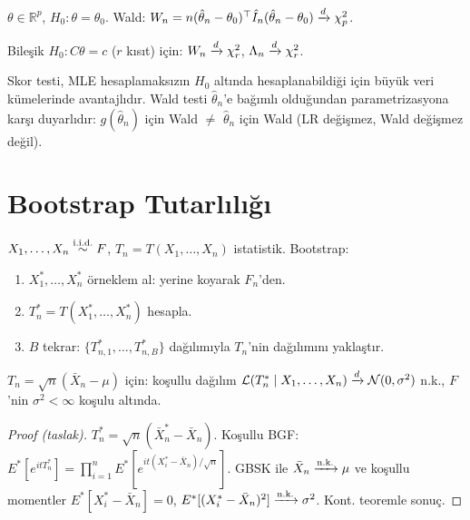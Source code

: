 \begin{ornek}\label{ex:wald_pvector}
$\theta\in\mathbb{R}^p$, $H_0:\theta=\theta_0$. Wald: $W_n=n(\hat\theta_n-\theta_0)^\top\hat{I}_n(\hat\theta_n-\theta_0)\xrightarrow{d}\chi^2_p$.

Bileşik $H_0: C\theta=c$ ($r$ kısıt) için: $W_n\xrightarrow{d}\chi^2_r$, $\Lambda_n\xrightarrow{d}\chi^2_r$.
\end{ornek}

\begin{hataanalizi}
Skor testi, MLE hesaplamaksızın $H_0$ altında hesaplanabildiği için büyük veri kümelerinde avantajlıdır. Wald testi $\hat\theta_n$'e bağımlı olduğundan parametrizasyona karşı duyarlıdır: $g(\hat\theta_n)$ için Wald $\neq$ $\hat\theta_n$ için Wald (LR değişmez, Wald değişmez değil).
\end{hataanalizi}

\section{Bootstrap Tutarlılığı}
\label{sec:bootstrap_tutarlilik}

\begin{tanim}\label{def:bootstrap}
$X_1,\ldots,X_n\overset{\text{i.i.d.}}{\sim} F$, $T_n=T(X_1,\ldots,X_n)$ istatistik. Bootstrap:
\begin{enumerate}
  \item $X_1^*,\ldots,X_n^*$ örneklem al: yerine koyarak $F_n$'den.
  \item $T_n^* = T(X_1^*,\ldots,X_n^*)$ hesapla.
  \item $B$ tekrar: $\{T_{n,1}^*,\ldots,T_{n,B}^*\}$ dağılımıyla $T_n$'nin dağılımını yaklaştır.
\end{enumerate}
\end{tanim}

\begin{teorem}\label{thm:bootstrap_tutarli}
$T_n=\sqrt{n}(\bar X_n-\mu)$ için: koşullu dağılım $\mathcal{L}(T_n^*\mid X_1,\ldots,X_n)\xrightarrow{d}\mathcal{N}(0,\sigma^2)$ n.k., $F$'nin $\sigma^2<\infty$ koşulu altında.
\end{teorem}

\begin{proof}[Proof (taslak)]
$T_n^*=\sqrt{n}(\bar X_n^*-\bar X_n)$. Koşullu BGF: $E^*[e^{it T_n^*}]=\prod_{i=1}^n E^*[e^{it(X_i^*-\bar X_n)/\sqrt{n}}]$. GBSK ile $\bar X_n\xrightarrow{\text{n.k.}}\mu$ ve koşullu momentler $E^*[X_i^*-\bar X_n]=0$, $E^*[(X_i^*-\bar X_n)^2]\xrightarrow{\text{n.k.}}\sigma^2$. Kont. teoremle sonuç.
\end{proof}

